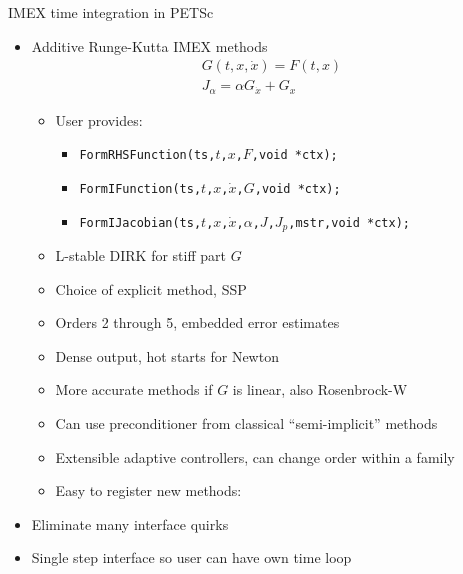 \begin{frame}[shrink=5]{IMEX time integration in PETSc}
  \begin{itemize}
  \item Additive Runge-Kutta IMEX methods
    \begin{gather*}
      G(t,x,\dot x) = F(t,x) \\
      J_\alpha = \alpha G_{\dot x} + G_x
    \end{gather*}
    \begin{itemize}
    \item User provides:
      \begin{itemize}
      \item \texttt{FormRHSFunction(ts,$t$,$x$,$F$,void *ctx);}
      \item \texttt{FormIFunction(ts,$t$,$x$,$\dot x$,$G$,void *ctx);}
      \item \texttt{FormIJacobian(ts,$t$,$x$,$\dot x$,$\alpha$,$J$,$J_{p}$,mstr,void *ctx);}
      \end{itemize}
    \item L-stable DIRK for stiff part $G$
    \item Choice of explicit method, \eg SSP
    \item Orders 2 through 5, embedded error estimates
    \item Dense output, hot starts for Newton
    \item More accurate methods if $G$ is linear, also Rosenbrock-W
    \item Can use preconditioner from classical ``semi-implicit'' methods
    \item Extensible adaptive controllers, can change order within a family
    \item Easy to register new methods: 
    \end{itemize}
  \item Eliminate many interface quirks
  \item Single step interface so user can have own time loop
  \end{itemize}
\end{frame}
